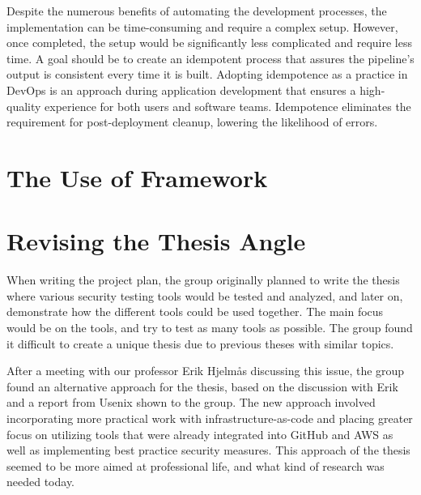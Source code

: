 Despite the numerous benefits of automating the development processes, the implementation can be time-consuming and require a complex setup. However, once completed, the setup would be significantly less complicated and require less time. A goal should be to create an idempotent process that assures the pipeline's output is consistent every time it is built. Adopting idempotence as a practice in DevOps is an approach during application development that ensures a high-quality experience for both users and software teams. Idempotence eliminates the requirement for post-deployment cleanup, lowering the likelihood of errors. \cite{idempotent}

\section{The Use of Framework}



\section{}




\section{Revising the Thesis Angle}
When writing the project plan, the group originally planned to write the thesis where various security testing tools would be tested and analyzed, and later on, demonstrate how the different tools could be used together. The main focus would be on the tools, and try to test as many tools as possible. The group found it difficult to create a unique thesis due to previous theses with similar topics. 

After a meeting with our professor Erik Hjelmås discussing this issue, the group found an alternative approach for the thesis, based on the discussion with Erik and a report from Usenix \cite{usenixreport} shown to the group. The new approach involved incorporating more practical work with infrastructure-as-code and placing greater focus on utilizing tools that were already integrated into GitHub and AWS as well as implementing best practice security measures. This approach of the thesis seemed to be more aimed at professional life, and what kind of research was needed today.  


